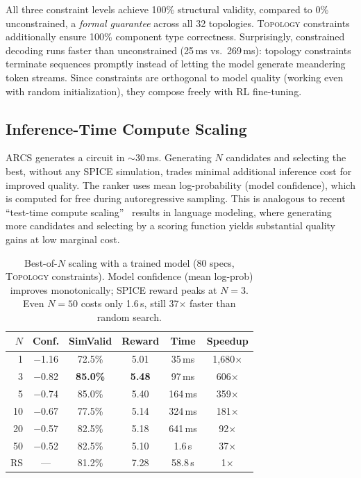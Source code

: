 \documentclass[conference]{IEEEtran}
\begin{document}
All three constraint levels achieve 100\% structural validity,
compared to 0\% unconstrained, a \emph{formal guarantee} across all
32 topologies. \textsc{Topology} constraints additionally ensure 100\%
component type correctness. Surprisingly, constrained decoding
runs faster than unconstrained (25\,ms vs.\ 269\,ms): topology
constraints terminate sequences promptly instead of letting the model
generate meandering token streams. Since constraints are orthogonal to model quality (working
even with random initialization), they compose freely with RL fine-tuning.

\subsection{Inference-Time Compute Scaling}
\label{sec:bestofn}

ARCS generates a circuit in $\sim$30\,ms. Generating $N$ candidates
and selecting the best, without any SPICE simulation, trades minimal
additional inference cost for improved quality. The ranker uses mean
log-probability
(model confidence), which is computed for free during autoregressive
sampling. This is analogous to recent ``test-time compute
scaling''~\cite{snell2024scaling} results in language modeling,
where generating more candidates and selecting by a scoring function
yields substantial quality gains at low marginal cost.

\begin{table}[t]
\centering
\caption{Best-of-$N$ scaling with a trained model (80 specs, \textsc{Topology}
constraints). Model confidence (mean log-prob) improves monotonically;
SPICE reward peaks at $N\!=\!3$. Even $N\!=\!50$ costs only 1.6\,s, still
37$\times$ faster than random search.}
\label{tab:bestofn}
\begin{tabular}{@{}rccccc@{}}
\toprule
$N$ & Conf. & SimValid & Reward & Time & Speedup \\\midrule
1  & $-$1.16 & 72.5\% & 5.01 & 35\,ms  & 1,680$\times$ \\
3  & $-$0.82 & \textbf{85.0\%} & \textbf{5.48} & 97\,ms  & 606$\times$ \\
5  & $-$0.74 & 85.0\% & 5.40 & 164\,ms & 359$\times$ \\
10 & $-$0.67 & 77.5\% & 5.14 & 324\,ms & 181$\times$ \\
20 & $-$0.57 & 82.5\% & 5.18 & 641\,ms & 92$\times$ \\
50 & $-$0.52 & 82.5\% & 5.10 & 1.6\,s  & 37$\times$ \\
\midrule
RS & --- & 81.2\% & 7.28 & 58.8\,s & 1$\times$ \\
\bottomrule
\end{tabular}
\end{table}
\end{document}
